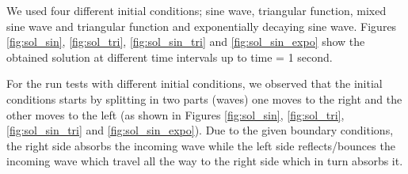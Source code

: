 We used four different initial conditions; sine wave, triangular function, mixed sine wave and triangular function and exponentially decaying sine wave. Figures \ref{fig:sol_sin}, \ref{fig:sol_tri}, \ref{fig:sol_sin_tri} and \ref{fig:sol_sin_expo} show the obtained solution at different time intervals up to time = 1 second. 

For the run tests with different initial conditions, we observed that the initial conditions starts by splitting in two parts (waves) one moves to the right and the other moves to the left (as shown in Figures \ref{fig:sol_sin}, \ref{fig:sol_tri}, \ref{fig:sol_sin_tri} and \ref{fig:sol_sin_expo}). Due to the given boundary conditions, the right side absorbs the incoming wave while the left side reflects/bounces the incoming wave which travel all the way to the right side which in turn absorbs it. 


